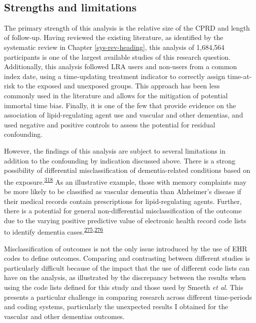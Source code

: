 \documentclass[a4paper, twoside]{templates/ociamthesis}
\begin{document}
~

\hypertarget{cprd-limitations}{%
\subsection{Strengths and limitations}\label{cprd-limitations}}

The primary strength of this analysis is the relative size of the CPRD and length of follow-up. Having reviewed the existing literature, as identified by the systematic review in Chapter \ref{sys-rev-heading}, this analysis of 1,684,564 participants is one of the largest available studies of this research question. Additionally, this analysis followed LRA users and non-users from a common index date, using a time-updating treatment indicator to correctly assign time-at-risk to the exposed and unexposed groups. This approach has been less commonly used in the literature and allows for the mitigation of potential immortal time bias. Finally, it is one of the few that provide evidence on the association of lipid-regulating agent use and vascular and other dementias, and used negative and positive controls to assess the potential for residual confounding.

However, the findings of this analysis are subject to several limitations in addition to the confounding by indication discussed above. There is a strong possibility of differential misclassification of dementia-related conditions based on the exposure.\textsuperscript{\protect\hyperlink{ref-porta2014}{318}} As an illustrative example, those with memory complaints may be more likely to be classified as vascular dementia than Alzheimer's disease if their medical records contain prescriptions for lipid-regulating agents. Further, there is a potential for general non-differential misclassification of the outcome due to the varying positive predictive value of electronic health record code lists to identify dementia cases.\textsuperscript{\protect\hyperlink{ref-mcguinness2019validity}{275},\protect\hyperlink{ref-wilkinson2018}{276}}

Misclassification of outcomes is not the only issue introduced by the use of EHR codes to define outcomes. Comparing and contrasting between different studies is particularly difficult because of the impact that the use of different code lists can have on the analysis, as illustrated by the discrepancy between the results when using the code lists defined for this study and those used by Smeeth \emph{et al}. This presents a particular challenge in comparing research across different time-periods and coding systems, particularly the unexpected results I obtained for the vascular and other dementias outcomes.
\end{document}

